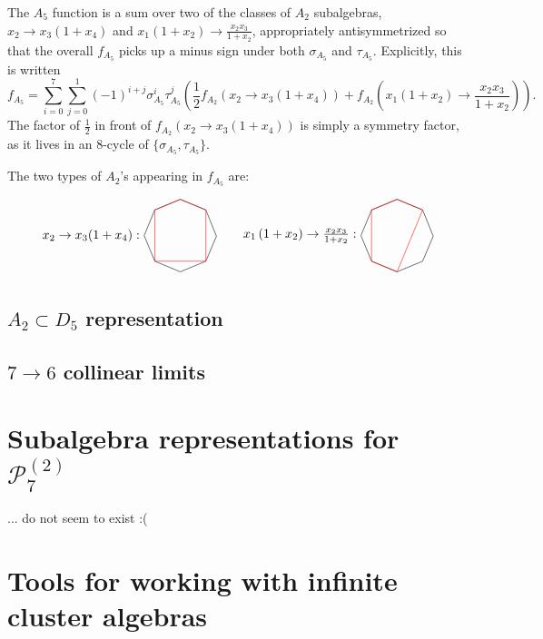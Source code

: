 \documentclass[11pt]{article}
\def\pdfeq#1{\texorpdfstring{$#1$}{a}}
\def\drawOctagon{
\coordinate (P1) at (45:1);
\coordinate (P2) at (90:1);
\coordinate (P3) at (135:1);
\coordinate (P4) at (180:1);
\coordinate (P5) at (225:1);
\coordinate (P6) at (270:1);
\coordinate (P7) at (315:1);
\coordinate (P8) at (359:1);
\draw (P1) -- (P2) -- (P3) -- (P4) -- (P5) -- (P6) -- (P7) -- (P8) -- cycle;
}
\begin{document}
The $A_5$ function is a sum over two of the classes of $A_2$ subalgebras, $x_2\to x_3\left(1+x_4\right)$ and $x_1 \left(1+x_2\right)\to \frac{x_2x_3}{1+x_2}$, appropriately antisymmetrized so that the overall $f_{A_5}$ picks up a minus sign under both $\sigma_{A_5}$ and $\tau_{A_5}$. Explicitly, this is written
\begin{equation}
	f_{A_5} = \sum_{i=0}^7\sum_{j=0}^1(-1)^{i+j}\sigma_{A_5}^i\tau_{A_5}^j\left(\frac12 f_{A_2}\left(x_2\to x_3\left(1+x_4\right)\right) + f_{A_2}\left(x_1 \left(1+x_2\right)\to \frac{x_2x_3}{1+x_2}\right)\right).
\end{equation}
The factor of $\frac12$ in front of $f_{A_2}\left(x_2\to x_3\left(1+x_4\right)\right)$ is simply a symmetry factor, as it lives in an 8-cycle of $\{\sigma_{A_5},\tau_{A_5}\}$.

The two types of $A_2$'s appearing in $f_{A_5}$ are:

\begin{equation}
\begin{tikzpicture}
\drawOctagon
\draw[color=red] (P1) -- (P2) -- (P3) -- (P5) -- (P7) -- cycle;
\node[anchor=east] at (-1,0) (a) {$x_2 \to x_3(1+x_4):$};
\begin{scope}[xshift=6cm]
\drawOctagon
\node[anchor=east] at (-1,0) (a) {$x_1 \left(1+x_2\right)\to \frac{x_2x_3}{1+x_2}:$};
\draw[color=red] (P1) -- (P2) -- (P3) -- (P5) -- (P6) -- cycle;
\end{scope}
\end{tikzpicture}
\end{equation}

\subsection{\pdfeq{A_2\subset D_5} representation}
\subsection{\pdfeq{7\to6} collinear limits}

\section{Subalgebra representations for \pdfeq{\mathcal{P}_7^{(2)}}}

... do not seem to exist :(

\section{Tools for working with infinite cluster algebras}
\end{document}
